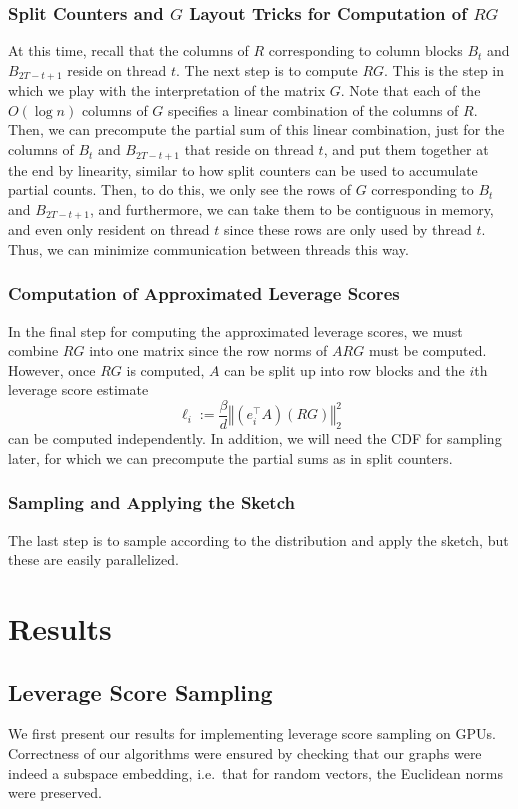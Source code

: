 \documentclass[12pt]{article}
\providecommand{\norm}[1]{\left\Vert#1\right\Vert}
\begin{document}
\subsubsection{Split Counters and $G$ Layout Tricks for Computation of $RG$}
At this time, recall that the columns of $R$ corresponding to column blocks $B_t$ and $B_{2T-t+1}$ reside on thread $t$. The next step is to compute $RG$. This is the step in which we play with the interpretation of the matrix $G$. Note that each of the $O(\log n)$ columns of $G$ specifies a linear combination of the columns of $R$. Then, we can precompute the partial sum of this linear combination, just for the columns of $B_t$ and $B_{2T-t+1}$ that reside on thread $t$, and put them together at the end by linearity, similar to how split counters can be used to accumulate partial counts. Then, to do this, we only see the rows of $G$ corresponding to $B_t$ and $B_{2T-t+1}$, and furthermore, we can take them to be contiguous in memory, and even only resident on thread $t$ since these rows are only used by thread $t$. Thus, we can minimize communication between threads this way.

\subsubsection{Computation of Approximated Leverage Scores}
In the final step for computing the approximated leverage scores, we must combine $RG$ into one matrix since the row norms of $ARG$ must be computed. However, once $RG$ is computed, $A$ can be split up into row blocks and the $i$th leverage score estimate
\[
	\ell_i := \frac{\beta}{d}\norm{(e_i^\top A)(RG)}_2^2
\]
can be computed independently. In addition, we will need the CDF for sampling later, for which we can precompute the partial sums as in split counters. 

\subsubsection{Sampling and Applying the Sketch}
The last step is to sample according to the distribution and apply the sketch, but these are easily parallelized.

\section{Results}

\subsection{Leverage Score Sampling}
We first present our results for implementing leverage score sampling on GPUs. Correctness of our algorithms were ensured by checking that our graphs were indeed a subspace embedding, i.e.\ that for random vectors, the Euclidean norms were preserved. 
\end{document}
